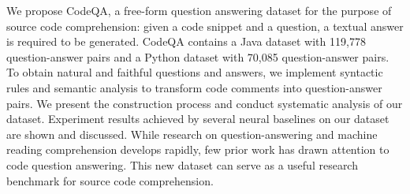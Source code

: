 We propose CodeQA, a free-form question answering dataset for the purpose of source code comprehension: given a code snippet and a question, a textual answer is required to be generated. CodeQA contains a Java dataset with 119,778 question-answer pairs and a Python dataset with 70,085 question-answer pairs. To obtain natural and faithful questions and answers, we implement syntactic rules and semantic analysis to transform code comments into question-answer pairs. We present the construction process and conduct systematic analysis of our dataset. Experiment results achieved by several neural baselines on our dataset are shown and discussed. While research on question-answering and machine reading comprehension develops rapidly, few prior work has drawn attention to code question answering. This new dataset can serve as a useful research benchmark for source code comprehension.

